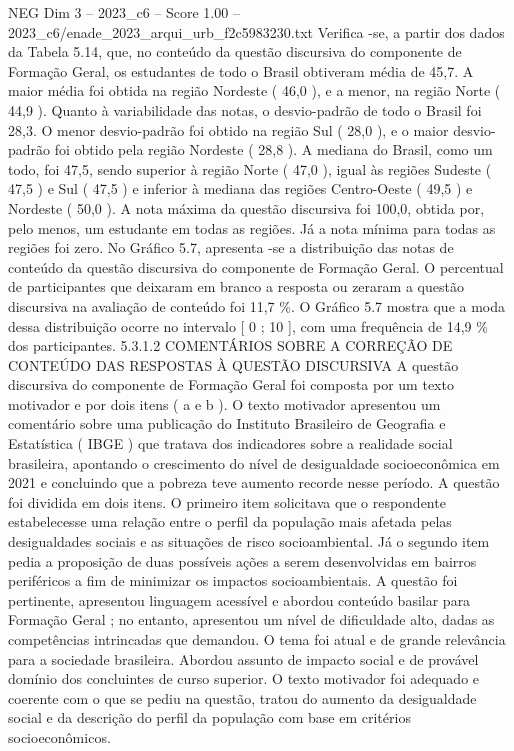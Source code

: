 \begin{textsample}{NEG Dim 3 – 2023\_c6 – Score 1.00 – 2023\_c6/enade\_2023\_arqui\_urb\_f2c5983230.txt}
Verifica -se, a partir dos dados da Tabela 5.14, que, no conteúdo da questão discursiva do componente de Formação Geral, os estudantes de todo o Brasil obtiveram média de 45,7.
A maior média foi obtida na região Nordeste ( 46,0 ), e a menor, na região Norte ( 44,9 ).
Quanto à variabilidade das notas, o desvio-padrão de todo o Brasil foi 28,3.
O menor desvio-padrão foi obtido na região Sul ( 28,0 ), e o maior desvio-padrão foi obtido pela região Nordeste ( 28,8 ).
A mediana do Brasil, como um todo, foi 47,5, sendo superior à região Norte ( 47,0 ), igual às regiões Sudeste ( 47,5 ) e Sul ( 47,5 ) e inferior à mediana das regiões Centro-Oeste ( 49,5 ) e Nordeste ( 50,0 ).
A nota máxima da questão discursiva foi 100,0, obtida por, pelo menos, um estudante em todas as regiões.
Já a nota mínima para todas as regiões foi zero.
No Gráfico 5.7, apresenta -se a distribuição das notas de conteúdo da questão discursiva do componente de Formação Geral.
O percentual de participantes que deixaram em branco a resposta ou zeraram a questão discursiva na avaliação de conteúdo foi 11,7 \%.
O Gráfico 5.7 mostra que a moda dessa distribuição ocorre no intervalo [ 0 ; 10 ], com uma frequência de 14,9 \% dos participantes. 5.3.1.2 COMENTÁRIOS SOBRE A CORREÇÃO DE CONTEÚDO DAS RESPOSTAS À QUESTÃO DISCURSIVA A questão discursiva do componente de Formação Geral foi composta por um texto motivador e por dois itens ( a e b ).
O texto motivador apresentou um comentário sobre uma publicação do Instituto Brasileiro de Geografia e Estatística ( IBGE ) que tratava dos indicadores sobre a realidade social brasileira, apontando o crescimento do nível de desigualdade socioeconômica em 2021 e concluindo que a pobreza teve aumento recorde nesse período.
A questão foi dividida em dois itens.
O primeiro item solicitava que o respondente estabelecesse uma relação entre o perfil da população mais afetada pelas desigualdades sociais e as situações de risco socioambiental.
Já o segundo item pedia a proposição de duas possíveis ações a serem desenvolvidas em bairros periféricos a fim de minimizar os impactos socioambientais.
A questão foi pertinente, apresentou linguagem acessível e abordou conteúdo basilar para Formação Geral ; no entanto, apresentou um nível de dificuldade alto, dadas as competências intrincadas que demandou.
O tema foi atual e de grande relevância para a sociedade brasileira.
Abordou assunto de impacto social e de provável domínio dos concluintes de curso superior.
O texto motivador foi adequado e coerente com o que se pediu na questão, tratou do aumento da desigualdade social e da descrição do perfil da população com base em critérios socioeconômicos.

\end{textsample}
